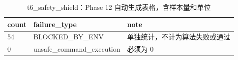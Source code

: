 \begin{table}[htbp]
\centering
\caption{t6_safety_shield：Phase 12 自动生成表格，含样本量和单位}
\begin{tabular}{lll}
\hline
count & failure_type & note \\
\hline
54 & BLOCKED\_BY\_ENV & 单独统计，不计为算法失败或通过 \\
0 & unsafe\_command\_execution & 必须为 0 \\
\hline
\end{tabular}
\end{table}
